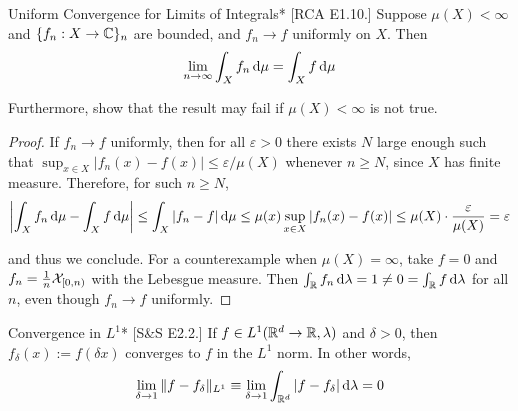 \begin{problem}{Uniform Convergence for Limits of Integrals}*
    [RCA E1.10.] Suppose $\mu(X) < \infty$ and $\{f_n : X \to \mathbb{C}\}_n$ are bounded, and $f_n \to f$ uniformly on $X$. Then 
    $$
    \lim_{n \to \infty} \int_X f_n \, \mathrm{d}\mu = \int_X f \, \mathrm{d}\mu
    $$

    Furthermore, show that the result may fail if $\mu(X) < \infty$ is not true. 
\end{problem}

\begin{proof}
    If $f_n \to f$ uniformly, then for all $\varepsilon > 0$ there exists $N$ large enough such that $\sup_{x \in X} |f_n(x) - f(x)| \leq \varepsilon / \mu(X)$ whenever $n \geq N$, since $X$ has finite measure. Therefore, for such $n \geq N$, 
    $$
    \left| \int_X f_n \, \mathrm{d}\mu - \int_X f \, \mathrm{d}\mu \right| 
    \leq \int_X |f_n - f| \, \mathrm{d}\mu 
    \leq \mu(x) \sup_{x \in X} |f_n(x) - f(x)|
    \leq \mu(X) \cdot \frac{\varepsilon}{\mu(X)}
    = \varepsilon
    $$

    and thus we conclude. For a counterexample when $\mu(X) = \infty$, take $f = 0$ and $f_n = \frac{1}{n} \mathcal{X}_{[0, n)}$ with the Lebesgue measure. Then $\int_{\mathbb{R}} f_n \, \mathrm{d}\lambda = 1 \neq 0 = \int_{\mathbb{R}} f \, \mathrm{d}\lambda$ for all $n$, even though $f_n \to f$ uniformly. 
\end{proof}

\begin{problem}{Convergence in $L^1$}*
    [S\&S E2.2.] If $f \in L^1(\mathbb{R}^d \to \mathbb{R}, \lambda)$ and $\delta > 0$, then $f_\delta(x) := f(\delta x)$ converges to $f$ in the $L^1$ norm. In other words, 
    $$
    \lim_{\delta \to 1} \| f - f_\delta \|_{L^1} 
    \equiv \lim_{\delta \to 1} \int_{\mathbb{R}^d} |f - f_\delta| \, \mathrm{d}\lambda = 0
    $$
\end{problem}

